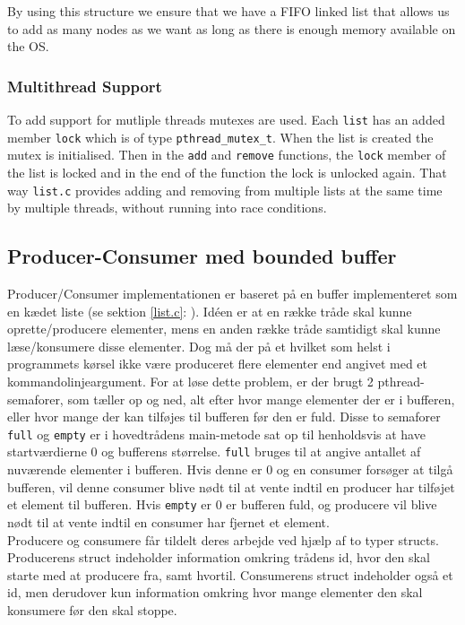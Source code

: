 By using this structure we ensure that we have a FIFO linked list that allows us to add as many nodes as we want as long as there is enough memory available on the OS.

\subsubsection{Multithread Support}
To add support for mutliple threads mutexes are used. Each \texttt{list} has an added member \texttt{lock} which is of type \texttt{pthread\_mutex\_t}. When the list is created the mutex is initialised. Then in the \texttt{add} and \texttt{remove} functions, the \texttt{lock} member of the list is locked and in the end of the function the lock is unlocked again. That way \texttt{list.c} provides adding and removing from multiple lists at the same time by multiple threads, without running into race conditions.

\subsection{Producer-Consumer med bounded buffer}
Producer/Consumer implementationen er baseret på en buffer implementeret som en kædet liste (se sektion \ref{list.c}: ). Idéen er at en række tråde skal kunne oprette/producere elementer, mens en anden række tråde samtidigt skal kunne læse/konsumere disse elementer. Dog må der på et hvilket som helst i programmets kørsel ikke være produceret flere elementer end angivet med et kommandolinjeargument. For at løse dette problem, er der brugt 2 pthread-semaforer, som tæller op og ned, alt efter hvor mange elementer der er i bufferen, eller hvor mange der kan tilføjes til bufferen før den er fuld. Disse to semaforer \texttt{full} og \texttt{empty} er i hovedtrådens main-metode sat op til henholdsvis at have startværdierne 0 og bufferens størrelse. \texttt{full} bruges til at angive antallet af nuværende elementer i bufferen. Hvis denne er 0 og en consumer forsøger at tilgå bufferen, vil denne consumer blive nødt til at vente indtil en producer har tilføjet et element til bufferen. Hvis \texttt{empty} er 0 er bufferen fuld, og producere vil blive nødt til at vente indtil en consumer har fjernet et element.\\

Producere og consumere får tildelt deres arbejde ved hjælp af to typer structs. Producerens struct indeholder information omkring trådens id, hvor den skal starte med at producere fra, samt hvortil. Consumerens struct indeholder også et id, men derudover kun information omkring hvor mange elementer den skal konsumere før den skal stoppe.

